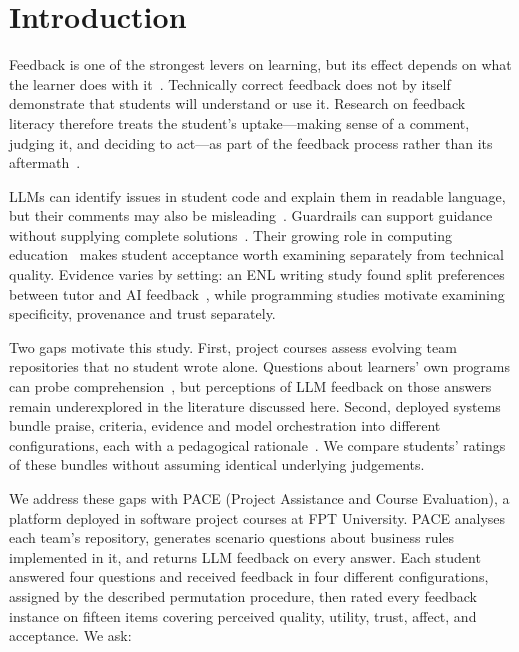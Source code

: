 \documentclass[runningheads]{llncs}
\begin{document}
\section{Introduction}
\label{sec:intro}

Feedback is one of the strongest levers on learning, but its effect depends on what the learner does with it~\cite{hattie2007power,shute2008focus}. Technically correct feedback does not by itself demonstrate that students will understand or use it. Research on feedback literacy therefore treats the student's uptake---making sense of a comment, judging it, and deciding to act---as part of the feedback process rather than its aftermath~\cite{carless2018feedback,winstone2017supporting}.

LLMs can identify issues in student code and explain them in readable language, but their comments may also be misleading~\cite{hellas2023exploring,kiesler2023exploring,dai2023can}. Guardrails can support guidance without supplying complete solutions~\cite{liffiton2023codehelp}. Their growing role in computing education~\cite{denny2024computing,kasneci2023chatgpt} makes student acceptance worth examining separately from technical quality. Evidence varies by setting: an ENL writing study found split preferences between tutor and AI feedback~\cite{escalante2023ai}, while programming studies motivate examining specificity, provenance and trust separately.

Two gaps motivate this study. First, project courses assess evolving team repositories that no student wrote alone. Questions about learners' own programs can probe comprehension~\cite{lehtinen2021lets}, but perceptions of LLM feedback on those answers remain underexplored in the literature discussed here. Second, deployed systems bundle praise, criteria, evidence and model orchestration into different configurations, each with a pedagogical rationale~\cite{parkes2013feedback,jonsson2007use,khosravi2022explainable,du2024improving}. We compare students' ratings of these bundles without assuming identical underlying judgements.

We address these gaps with PACE (Project Assistance and Course Evaluation), a platform deployed in software project courses at FPT University. PACE analyses each team's repository, generates scenario questions about business rules implemented in it, and returns LLM feedback on every answer. Each student answered four questions and received feedback in four different configurations, assigned by the described permutation procedure, then rated every feedback instance on fifteen items covering perceived quality, utility, trust, affect, and acceptance. We ask:
\end{document}
